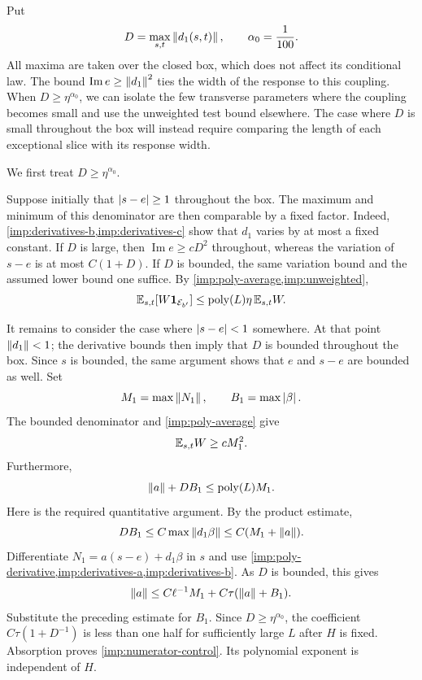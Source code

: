 Put
\[
 D=\max_{s,t}\left\lVert d_1(s,t)\right\rVert,\qquad \alpha_0=\frac1{100}.
\]
All maxima are taken over the closed box, which does not affect its
conditional law. The bound $\operatorname{Im}e\ge\left\lVert d_1\right\rVert^2$ ties the
width of the response to this coupling. When $D\ge\eta^{\alpha_0}$, we
can isolate the few transverse parameters where the coupling becomes
small and use the unweighted test bound elsewhere. The case where $D$
is small throughout the box will instead require comparing the length
of each exceptional slice with its response width.

We first treat $D\ge\eta^{\alpha_0}$.

Suppose initially that $\left\lvert s-e\right\rvert\ge1$ throughout the box. The maximum
and minimum of this denominator are then comparable by a fixed factor.
Indeed, \cref{imp:derivatives-b,imp:derivatives-c} show that $d_1$ varies
by at most a fixed constant. If $D$ is large, then
$\operatorname{Im}e\ge cD^2$ throughout, whereas the variation of
$s-e$ is at most $C(1+D)$. If $D$ is bounded, the same variation bound
and the assumed lower bound one suffice. By
\cref{imp:poly-average,imp:unweighted},
\begin{equation}
 \mathbb E_{s,t}[W\mathbf 1_{\mathcal E_{b'}}]
 \le\operatorname{poly}(L)\eta\,\mathbb E_{s,t}W.
 \label{imp:comparable-case}
\end{equation}

It remains to consider the case where $\left\lvert s-e\right\rvert<1$ somewhere. At that
point $\left\lVert d_1\right\rVert<1$; the derivative bounds then imply that $D$ is
bounded throughout the box. Since $s$ is bounded, the same argument
shows that $e$ and $s-e$ are bounded as well. Set
\[
 M_1=\max\left\lVert N_1\right\rVert,\qquad B_1=\max\left\lvert\beta\right\rvert.
\]
The bounded denominator and \cref{imp:poly-average} give
\begin{equation}
 \mathbb E_{s,t}W\ge cM_1^2.
 \label{imp:weight-lower}
\end{equation}
Furthermore,
\begin{equation}
 \left\lVert a\right\rVert+DB_1\le\operatorname{poly}(L)M_1.
 \label{imp:numerator-control}
\end{equation}
Here is the required quantitative argument. By the product estimate,
\[
 DB_1\le C\max\left\lVert d_1\beta\right\rVert
       \le C(M_1+\left\lVert a\right\rVert).
\]
Differentiate $N_1=a(s-e)+d_1\beta$ in $s$ and use
\cref{imp:poly-derivative,imp:derivatives-a,imp:derivatives-b}. As $D$
is bounded, this gives
\[
 \left\lVert a\right\rVert\le C\ell^{-1}M_1+C\tau(\left\lVert a\right\rVert+B_1).
\]
Substitute the preceding estimate for $B_1$. Since
$D\ge\eta^{\alpha_0}$, the coefficient
$C\tau(1+D^{-1})$ is less than one half for sufficiently large $L$
after $H$ is fixed. Absorption proves \cref{imp:numerator-control}.
Its polynomial exponent is independent of $H$.

